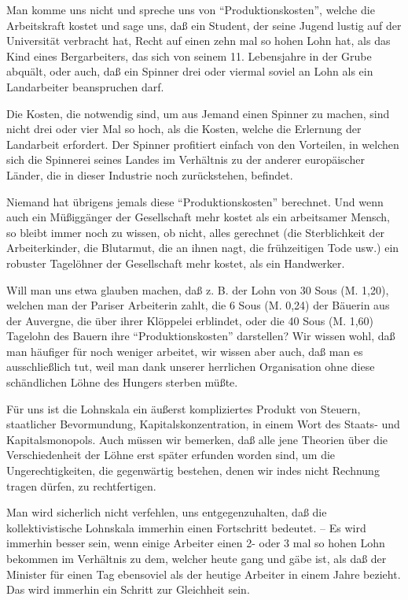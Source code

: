 \documentclass{scrbook}
\begin{document}
Man komme uns nicht und spreche uns von ``Produktionskosten'', welche die Arbeitskraft kostet und sage uns, daß ein Student, der seine Jugend lustig auf der Universität verbracht hat, Recht auf einen zehn mal so hohen Lohn hat, als das Kind eines Bergarbeiters, das sich von seinem 11. Lebensjahre in der Grube abquält, oder auch, daß ein Spinner drei oder viermal soviel an Lohn als ein Landarbeiter beanspruchen darf.

Die Kosten, die notwendig sind, um aus Jemand einen Spinner zu machen, sind nicht drei oder vier Mal so hoch, als die Kosten, welche die Erlernung der Landarbeit erfordert. Der Spinner profitiert einfach von den Vorteilen, in welchen sich die Spinnerei seines Landes im Verhältnis zu der anderer europäischer Länder, die in dieser Industrie noch zurückstehen, befindet.

Niemand hat übrigens jemals diese ``Produktionskosten'' berechnet. Und wenn auch ein Müßiggänger der Gesellschaft mehr kostet als ein arbeitsamer Mensch, so bleibt immer noch zu wissen, ob nicht, alles gerechnet (die Sterblichkeit der Arbeiterkinder, die Blutarmut, die an ihnen nagt, die frühzeitigen Tode usw.) ein robuster Tagelöhner der Gesellschaft mehr kostet, als ein Handwerker.

Will man uns etwa glauben machen, daß z. B. der Lohn von 30 Sous (M. 1,20), welchen man der Pariser Arbeiterin zahlt, die 6 Sous (M. 0,24) der Bäuerin aus der Auvergne, die über ihrer Klöppelei erblindet, oder die 40 Sous (M. 1,60) Tagelohn des Bauern ihre ``Produktionskosten'' darstellen? Wir wissen wohl, daß man häufiger für noch weniger arbeitet, wir wissen aber auch, daß man es ausschließlich tut, weil man dank unserer herrlichen Organisation ohne diese schändlichen Löhne des Hungers sterben müßte.

Für uns ist die Lohnskala ein äußerst kompliziertes Produkt von Steuern, staatlicher Bevormundung, Kapitalskonzentration, in einem Wort des Staats- und Kapitalsmonopols. Auch müssen wir bemerken, daß alle jene Theorien über die Verschiedenheit der Löhne erst später erfunden worden sind, um die Ungerechtigkeiten, die gegenwärtig bestehen, denen wir indes nicht Rechnung tragen dürfen, zu rechtfertigen.

Man wird sicherlich nicht verfehlen, uns entgegenzuhalten, daß die kollektivistische Lohnskala immerhin einen Fortschritt bedeutet. – Es wird immerhin besser sein, wenn einige Arbeiter einen 2- oder 3 mal so hohen Lohn bekommen im Verhältnis zu dem, welcher heute gang und gäbe ist, als daß der Minister für einen Tag ebensoviel als der heutige Arbeiter in einem Jahre bezieht. Das wird immerhin ein Schritt zur Gleichheit sein.
\end{document}
